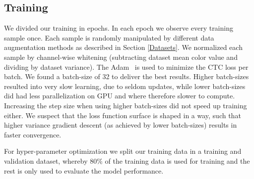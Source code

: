 \subsection{Training}\label{subsec:training}

We divided our training in epochs.
In each epoch we observe every training sample once.
Each sample is randomly manipulated by different data augmentation methods as described in Section \ref{Datasets}.
We normalized each sample by channel-wise whitening (subtracting dataset mean color value and dividing by dataset variance).
The Adam~\cite{Adam} is used to minimize the CTC loss per batch.
We found a batch-size of 32 to deliver the best results.
Higher batch-sizes resulted into very slow learning, due to seldom updates, while lower batch-sizes did had less parallelization on GPU and where therefore slower to compute.
Increasing the step size when using higher batch-sizes did not speed up training either.
We suspect that the loss function surface is shaped in a way, such that higher variance gradient descent (as achieved by lower batch-sizes) results in faster convergence.

For hyper-parameter optimization we split our training data in a training and validation dataset, whereby 80\% of the training data is used for training and the rest is only used to evaluate the model performance.
